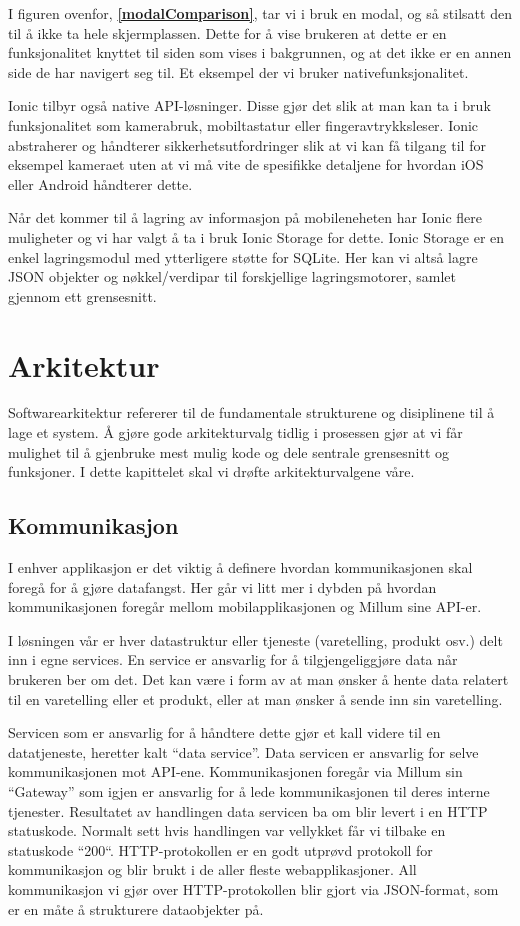 I figuren ovenfor, \textbf{\ref{modalComparison}}, tar vi i bruk en modal, og så stilsatt den til å ikke ta hele skjermplassen. Dette for å vise brukeren at dette er en funksjonalitet knyttet til siden som vises i bakgrunnen, og at det ikke er en annen side de har navigert seg til. Et eksempel der vi bruker nativefunksjonalitet.

Ionic tilbyr også native API-løsninger. Disse gjør det slik at man kan ta i bruk funksjonalitet som kamerabruk, mobiltastatur eller fingeravtrykksleser. Ionic abstraherer og håndterer sikkerhetsutfordringer slik at vi kan få tilgang til for eksempel kameraet uten at vi må vite de spesifikke detaljene for hvordan iOS eller Android håndterer dette. 

Når det kommer til å lagring av informasjon på mobileneheten har Ionic flere muligheter og vi har valgt å ta i bruk Ionic Storage \cite{ionic:storage} for dette. Ionic Storage er en enkel lagringsmodul med ytterligere støtte for SQLite. Her kan vi altså lagre JSON objekter og nøkkel/verdipar til forskjellige lagringsmotorer, samlet gjennom ett grensesnitt.

\section{\textbf{Arkitektur}}
Softwarearkitektur refererer til de fundamentale strukturene og disiplinene til å lage et system. Å gjøre gode arkitekturvalg tidlig i prosessen gjør at vi får mulighet til å gjenbruke mest mulig kode og dele sentrale grensesnitt og funksjoner. I dette kapittelet skal vi drøfte arkitekturvalgene våre.

\subsection{\textbf{Kommunikasjon}} \label{kommunikasjon}
I enhver applikasjon er det viktig å definere hvordan kommunikasjonen skal foregå for å gjøre datafangst. Her går vi litt mer i dybden på hvordan kommunikasjonen foregår mellom mobilapplikasjonen og Millum sine API-er.

I løsningen vår er hver datastruktur eller tjeneste (varetelling, produkt osv.) delt inn i egne services. En service er ansvarlig for å tilgjengeliggjøre data når brukeren ber om det. Det kan være i form av at man ønsker å hente data relatert til en varetelling eller et produkt, eller at man ønsker å sende inn sin varetelling.

Servicen som er ansvarlig for å håndtere dette gjør et kall videre til en datatjeneste, heretter kalt “data service”. Data servicen er ansvarlig for selve kommunikasjonen mot API-ene. Kommunikasjonen foregår via Millum sin “Gateway” som igjen er ansvarlig for å lede kommunikasjonen til deres interne tjenester. Resultatet av handlingen data servicen ba om blir levert i en HTTP statuskode. Normalt sett hvis handlingen var vellykket får vi tilbake en statuskode ``200``. HTTP-protokollen er en godt utprøvd protokoll for kommunikasjon og blir brukt i de aller fleste webapplikasjoner. All kommunikasjon vi gjør over HTTP-protokollen blir gjort via JSON-format, som er en måte å strukturere dataobjekter på.

